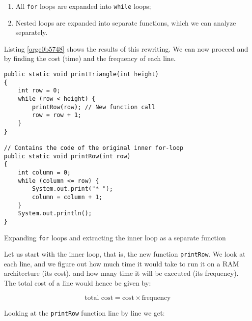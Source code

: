 \documentclass[11pt]{article}
\begin{document}
\begin{enumerate}
\item All \texttt{for} loops are expanded into \texttt{while} loops;
\item Nested loops are expanded into separate functions, which we can
analyze separately.
\end{enumerate}

Listing \ref{orge0b5748} shows the results of this
rewriting. We can now proceed and by finding the cost (time) and the
frequency of each line.

\begin{listing}[htbp]
\begin{verbatim}
public static void printTriangle(int height)
{                              
    int row = 0;               
    while (row < height) {     
        printRow(row); // New function call
        row = row + 1;         
    }
}

// Contains the code of the original inner for-loop
public static void printRow(int row)
{                                  
    int column = 0;                
    while (column <= row) {        
        System.out.print("* ");    
        column = column + 1;       
    }                              
    System.out.println();          
}
\end{verbatim}
\caption{\label{orge0b5748}Expanding \texttt{for} loops and extracting the inner loop as a separate function}
\end{listing}

Let us start with the inner loop, that is, the new function
\texttt{printRow}. We look at each line, and we figure out how much time it
would take to run it on a RAM architecture (its cost), and how many
time it will be executed (its frequency). The total cost of a line
would hence be given by:

\[
     \text{total cost} = \text{cost} \times \text{frequency}
  \]

Looking at the \texttt{printRow} function line by line we get:
\end{document}

